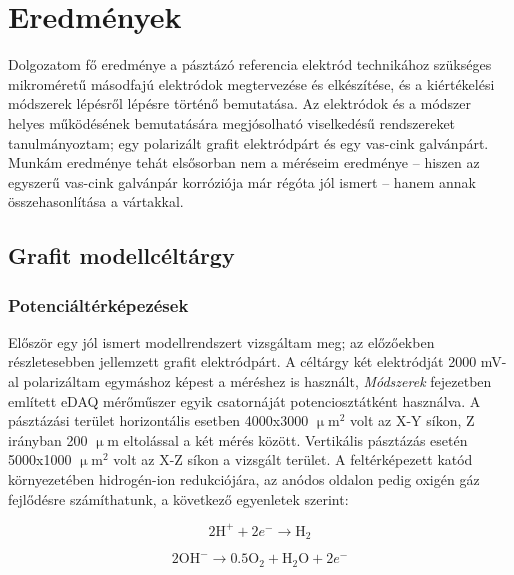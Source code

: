 \chapter{Eredmények}
\pagestyle{headings}

Dolgozatom fő eredménye a pásztázó referencia elektród technikához szükséges mikroméretű másodfajú elektródok megtervezése és elkészítése, és a kiértékelési módszerek lépésről lépésre történő bemutatása. Az elektródok és a módszer helyes működésének bemutatására megjósolható viselkedésű rendszereket tanulmányoztam; egy polarizált grafit elektródpárt és egy vas-cink galvánpárt. Munkám eredménye tehát elsősorban nem a méréseim eredménye -- hiszen az egyszerű vas-cink galvánpár korróziója már régóta jól ismert -- hanem annak összehasonlítása a vártakkal.

\section{Grafit modellcéltárgy}
\subsection{Potenciáltérképezések}

Először egy jól ismert modellrendszert vizsgáltam meg; az előzőekben részletesebben jellemzett grafit elektródpárt. A céltárgy két elektródját 2000 mV-al polarizáltam egymáshoz képest a méréshez is használt, \emph{Módszerek} fejezetben említett eDAQ mérőműszer egyik csatornáját potenciosztátként használva. A pásztázási terület horizontális esetben 4000x3000 $\upmu$m$^2$ volt az X-Y síkon, Z irányban 200 $\upmu$m eltolással a két mérés között. Vertikális pásztázás esetén 5000x1000 $\upmu$m$^2$ volt az X-Z síkon a vizsgált terület. A feltérképezett katód környezetében hidrogén-ion redukciójára, az anódos oldalon pedig oxigén gáz fejlődésre számíthatunk, a következő egyenletek szerint:

\begin{equation}
2\textrm{H}^+ + 2e^- \longrightarrow \textrm{H}_2
\label{grafit_katod}
\end{equation}

\begin{equation}
2\textrm{OH}^- \longrightarrow 0.5 \textrm{O}_2 + \textrm{H}_2\textrm{O} + 2e^-
\label{grafit_anod}
\end{equation}

